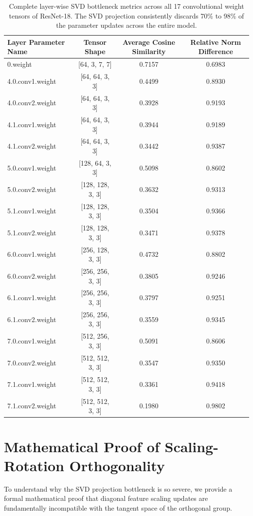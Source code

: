 \documentclass{article}
\begin{document}
\begin{table}[t]
\caption{Complete layer-wise SVD bottleneck metrics across all 17 convolutional weight tensors of ResNet-18. The SVD projection consistently discards 70\% to 98\% of the parameter updates across the entire model.}
\label{tab:full_svd_metrics}
\vskip 0.15in
\begin{center}
\begin{small}
\begin{tabular}{lccc}
\toprule
\textbf{Layer Parameter Name} & \textbf{Tensor Shape} & \textbf{Average Cosine Similarity} & \textbf{Relative Norm Difference} \\
\midrule
0.weight & [64, 3, 7, 7] & 0.7157 & 0.6983 \\
4.0.conv1.weight & [64, 64, 3, 3] & 0.4499 & 0.8930 \\
4.0.conv2.weight & [64, 64, 3, 3] & 0.3928 & 0.9193 \\
4.1.conv1.weight & [64, 64, 3, 3] & 0.3944 & 0.9189 \\
4.1.conv2.weight & [64, 64, 3, 3] & 0.3442 & 0.9387 \\
5.0.conv1.weight & [128, 64, 3, 3] & 0.5098 & 0.8602 \\
5.0.conv2.weight & [128, 128, 3, 3] & 0.3632 & 0.9313 \\
5.1.conv1.weight & [128, 128, 3, 3] & 0.3504 & 0.9366 \\
5.1.conv2.weight & [128, 128, 3, 3] & 0.3471 & 0.9378 \\
6.0.conv1.weight & [256, 128, 3, 3] & 0.4732 & 0.8802 \\
6.0.conv2.weight & [256, 256, 3, 3] & 0.3805 & 0.9246 \\
6.1.conv1.weight & [256, 256, 3, 3] & 0.3797 & 0.9251 \\
6.1.conv2.weight & [256, 256, 3, 3] & 0.3559 & 0.9345 \\
7.0.conv1.weight & [512, 256, 3, 3] & 0.5091 & 0.8606 \\
7.0.conv2.weight & [512, 512, 3, 3] & 0.3547 & 0.9350 \\
7.1.conv1.weight & [512, 512, 3, 3] & 0.3361 & 0.9418 \\
7.1.conv2.weight & [512, 512, 3, 3] & 0.1980 & 0.9802 \\
\bottomrule
\end{tabular}
\end{small}
\end{center}
\vskip -0.1in
\end{table}

\section{Mathematical Proof of Scaling-Rotation Orthogonality}
\label{appendix:proof}
To understand why the SVD projection bottleneck is so severe, we provide a formal mathematical proof that diagonal feature scaling updates are fundamentally incompatible with the tangent space of the orthogonal group.
\end{document}
